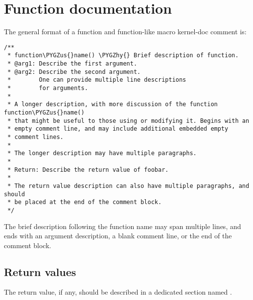\documentclass[a4paper,8pt,english]{sphinxmanual}
\def\PYGZus{\char`\_}
\def\PYGZhy{\char`\-}
\begin{document}
\section{Function documentation}
\label{doc-guide/kernel-doc:function-documentation}
The general format of a function and function-like macro kernel-doc comment is:

\begin{Verbatim}[commandchars=\\\{\}]
/**
 * function\PYGZus{}name() \PYGZhy{} Brief description of function.
 * @arg1: Describe the first argument.
 * @arg2: Describe the second argument.
 *        One can provide multiple line descriptions
 *        for arguments.
 *
 * A longer description, with more discussion of the function function\PYGZus{}name()
 * that might be useful to those using or modifying it. Begins with an
 * empty comment line, and may include additional embedded empty
 * comment lines.
 *
 * The longer description may have multiple paragraphs.
 *
 * Return: Describe the return value of foobar.
 *
 * The return value description can also have multiple paragraphs, and should
 * be placed at the end of the comment block.
 */
\end{Verbatim}

The brief description following the function name may span multiple lines, and
ends with an argument description, a blank comment line, or the end of the
comment block.


\subsection{Return values}
\label{doc-guide/kernel-doc:return-values}
The return value, if any, should be described in a dedicated section
named .
\end{document}
